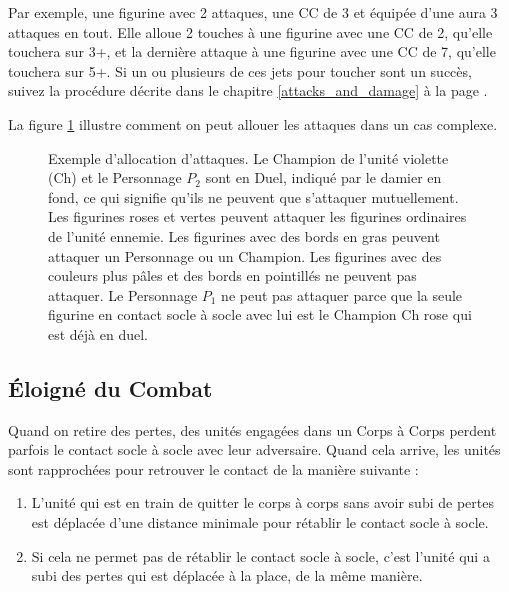 Par exemple, une figurine avec 2 attaques, une CC de 3 et équipée d'une \pw{} aura 3 attaques en tout. Elle alloue 2 touches à une figurine avec une CC de 2, qu'elle touchera sur 3+, et la dernière attaque à une figurine avec une CC de 7, qu'elle touchera sur 5+. Si un ou plusieurs de ces jets pour toucher sont un succès, suivez la procédure décrite dans le chapitre \ref{attacks_and_damage} à la page \pageref{attacks_and_damage}.

La figure \ref{figure/allocation} illustre comment on peut allouer les attaques dans un cas complexe.
\clearpage

\newcommand{\figAHCharOne}{$P_{1} $}
\newcommand{\figAHCharTwo}{$P_{2} $}
\newcommand{\figAHCharThree}{$P_{3} $}
\newcommand{\figAHChamp}{Ch}
\newcommand{\figAHMus}{Mu}
\newcommand{\figAHStand}{Ét}

\begin{figure}[!htbp]
\begin{minipage}{0.48\textwidth}
\def\svgwidth{\textwidth}

\end{minipage}\hfill\begin{minipage}{0.51\textwidth}
\caption{Exemple d'allocation d'attaques.\vspace*{10pt}\newline
Le Champion de l'unité violette (Ch) et le Personnage $ P_{2} $ sont en Duel, indiqué par le damier en fond, ce qui signifie qu'ils ne peuvent que s'attaquer mutuellement. Les figurines roses et vertes peuvent attaquer les figurines ordinaires de l'unité ennemie. Les figurines avec des bords en gras peuvent attaquer un Personnage ou un Champion. Les figurines avec des couleurs plus pâles et des bords en pointillés ne peuvent pas attaquer. Le Personnage $ P_{1} $ ne peut pas attaquer parce que la seule figurine en contact socle à socle avec lui est le Champion Ch rose qui est déjà en duel.}
\label{figure/allocation}
\end{minipage}
\end{figure}

\subsection{Éloigné du Combat}
\label{dropping_out_of_combat}

Quand on retire des pertes, des unités engagées dans un Corps à Corps perdent parfois le contact socle à socle avec leur adversaire. Quand cela arrive, les unités sont rapprochées pour retrouver le contact de la manière suivante :
\begin{enumerate}
\item L'unité qui est en train de quitter le corps à corps sans avoir subi de pertes est déplacée d'une distance minimale pour rétablir le contact socle à socle.
\item Si cela ne permet pas de rétablir le contact socle à socle, c'est l'unité qui a subi des pertes qui est déplacée à la place, de la même manière.
\end{enumerate}

